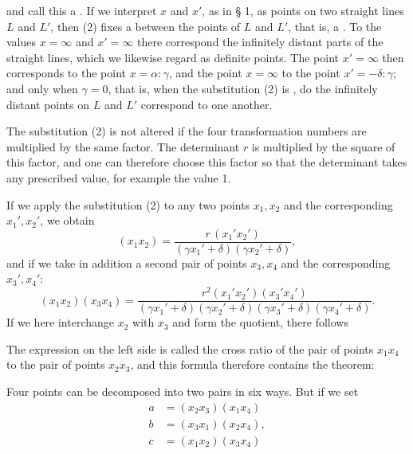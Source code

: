 and call this a . If we interpret $x$ and $x'$, as in § 1, as points on two straight lines $L$ and $L'$, then (2) fixes a  between the points of $L$ and $L'$, that is, a . To the values $x=\infty$ and $x'=\infty$ there correspond the infinitely distant parts of the straight lines, which we likewise regard as definite points. The point $x'=\infty$ then corresponds to the point $x=\alpha:\gamma$, and the point $x=\infty$ to the point $x'=-\delta:\gamma$; and only when $\gamma=0$, that is, when the substitution (2) is , do the infinitely distant points on $L$ and $L'$ correspond to one another.

The substitution (2) is not altered if the four transformation numbers are multiplied by the same factor. The determinant $r$ is multiplied by the square of this factor, and one can therefore choose this factor so that the determinant takes any prescribed value, for example the value 1.

If we apply the substitution (2) to any two points $x_1, x_2$ and the corresponding $x_1', x_2'$, we obtain
\[
(x_1x_2) = \frac{r\,(x_1'x_2')}{(\gamma x_1'+\delta)(\gamma x_2'+\delta)},
\]
and if we take in addition a second pair of points $x_3, x_4$ and the corresponding $x_3', x_4'$:
\[
(x_1x_2)(x_3x_4) = \frac{r^2(x_1'x_2')(x_3'x_4')}{(\gamma x_1'+\delta)(\gamma x_2'+\delta)(\gamma x_3'+\delta)(\gamma x_4'+\delta)}.
\]
If we here interchange $x_2$ with $x_3$ and form the quotient, there follows

The expression on the left side is called the cross ratio of the pair of points $x_1x_4$ to the pair of points $x_2x_3$, and this formula therefore contains the theorem:


Four points can be decomposed into two pairs in six ways. But if we set
\begin{align*}
a &= (x_2x_3)(x_1x_4) \\
b &= (x_3x_1)(x_2x_4), \\
c &= (x_1x_2)(x_3x_4)
\end{align*}
